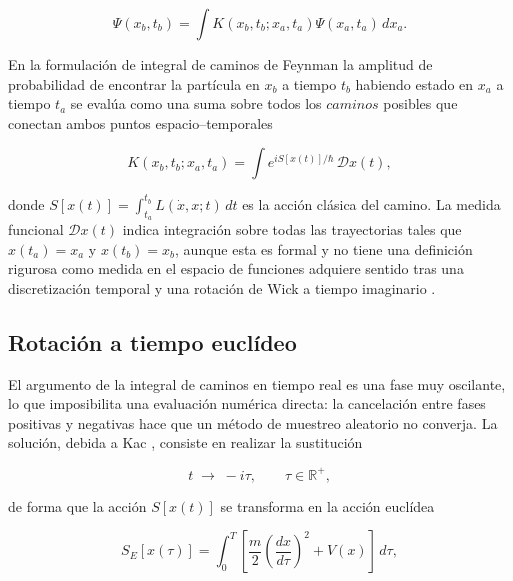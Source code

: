 \documentclass[11pt,a4paper,twoside,pdf]{article}
\numberwithin{equation}{section}
\begin{document}
\begin{equation}
    \Psi(x_b, t_b) = \int K(x_b, t_b; x_a, t_a) \Psi(x_a, t_a) \, dx_a.
\end{equation}


En la formulación de integral de caminos de Feynman la amplitud de probabilidad de encontrar la partícula en $x_b$ a tiempo $t_b$ habiendo estado en $x_a$ a tiempo $t_a$ se evalúa como una suma sobre todos los $caminos$ posibles que conectan ambos puntos espacio--temporales \cite{feynman2010quantum}

\begin{equation}
    K(x_b, t_b; x_a, t_a) = \int  e^{i S[x(t)]/\hbar} \,\mathcal{D} x(t),
    \label{pathint}
\end{equation}

donde $S[x(t)] = \int_{t_a}^{t_b} L(\dot{x}, x; t) \, dt$ es la acción clásica del camino. La medida funcional $\mathcal{D}x(t)$ indica integración sobre todas las trayectorias tales que $x(t_a) = x_a$ y $x(t_b) = x_b$, aunque esta es formal y no tiene una definición rigurosa como medida en el espacio de funciones adquiere sentido tras una discretización temporal y una rotación de Wick a tiempo imaginario \cite{galindo1990quantum}. \medskip








\subsection{Rotación a tiempo euclídeo}
\label{Wick}


El argumento de la integral de caminos en tiempo real es una fase muy oscilante, lo que imposibilita una evaluación numérica directa: la cancelación entre fases positivas y negativas hace que un método de muestreo aleatorio no converja. La solución, debida a Kac \cite{galindo1990quantum}, consiste en realizar la sustitución

\begin{equation}
    t \;\to\; -i\tau, \qquad \tau \in \mathbb{R}^+,
    \label{wick}
\end{equation}

de forma que la acción $S[x(t)]$ se transforma en la acción euclídea

\begin{equation}
    S_E[x(\tau)] = \int_0^{T} \left[ \frac{m}{2} \left( \frac{dx}{d\tau} \right)^2 + V(x) \right] \, d\tau,
    \label{Seuclid}
\end{equation}
\end{document}
